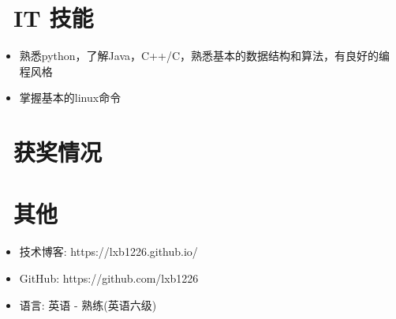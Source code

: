 \documentclass{resume}
\begin{document}

\section{\faCogs\ IT 技能}
\begin{itemize}[parsep=0.5ex]
    \item 熟悉python，了解Java，C++/C，熟悉基本的数据结构和算法，有良好的编程风格
    \item 掌握基本的linux命令
\end{itemize}

\section{\faHeartO\ 获奖情况}

\section{\faInfo\ 其他}
\begin{itemize}[parsep=0.5ex]
    \item 技术博客: https://lxb1226.github.io/
    \item GitHub: https://github.com/lxb1226
    \item 语言: 英语 - 熟练(英语六级)
\end{itemize}

%
%
\end{document}
